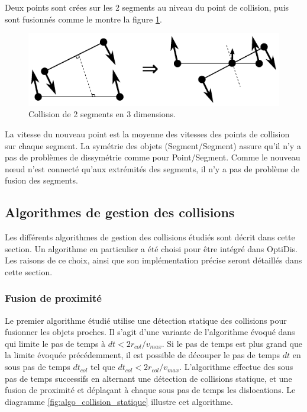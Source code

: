 \documentclass[11pt,class=article,float=false,crop=false]{standalone}
\begin{document}
Deux points sont crées sur les 2 segments au niveau du point de collision, puis sont fusionnés comme le montre la figure \ref{fig:topo_segseg}.

\begin{figure}[H]
	\centering
	\includegraphics[height=0.15\textheight]{img/topo_segseg}
	\caption{Collision de 2 segments en 3 dimensions.}
	\label{fig:topo_segseg}
\end{figure}

La vitesse du nouveau point est la moyenne des vitesses des points de collision sur chaque segment. La symétrie des objets (Segment/Segment) assure qu'il n'y a pas de problèmes de dissymétrie comme pour Point/Segment. Comme le nouveau nœud n'est connecté qu'aux extrémités des segments, il n'y a pas de problème de fusion des segments. 

\subsection{Algorithmes de gestion des collisions}

Les différents algorithmes de gestion des collisions étudiés sont décrit dans cette section. Un algorithme en particulier a été choisi pour être intégré dans OptiDis. Les raisons de ce choix, ainsi que son implémentation précise seront détaillés dans cette section.

\subsubsection{Fusion de proximité}

Le premier algorithme étudié utilise une détection statique des collisions pour fusionner les objets proches. Il s'agit d'une variante de l'algorithme évoqué dans  qui limite le pas de temps à $dt < 2r_{col}/v_{max}$. Si le pas de temps est plus grand que la limite évoquée précédemment, il est possible de découper le pas de temps $dt$ en sous pas de temps $dt_{col}$ tel que $dt_{col} <2r_{col}/v_{max}$. L'algorithme effectue des sous pas de temps successifs en alternant une détection de collisions statique, et une fusion de proximité et déplaçant à chaque sous pas de temps les dislocations. Le diagramme \ref{fig:algo_collision_statique} illustre cet algorithme.
\end{document}
